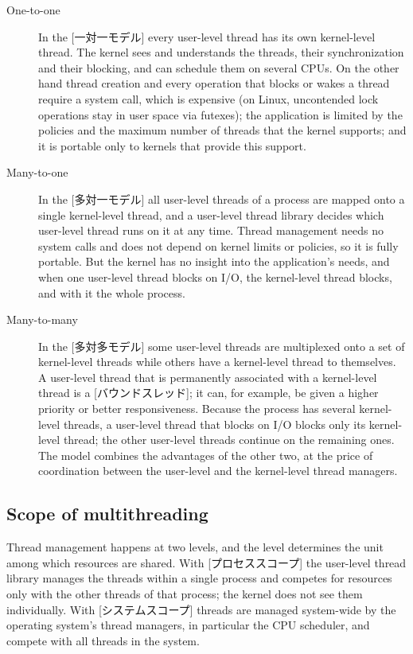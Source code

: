 \documentclass[../main.tex]{subfiles}
\begin{document}
\begin{description}
  \item[One-to-one] In the [一対一モデル] every
    user-level thread has its own kernel-level thread.  The kernel sees and
    understands the threads, their synchronization and their blocking, and
    can schedule them on several CPUs.  On the other hand thread creation
    and every operation that blocks or wakes a thread require a system
    call, which is expensive (on Linux, uncontended lock operations stay in
    user space via futexes); the application is limited by the policies and the maximum
    number of threads that the kernel supports; and it is portable only to
    kernels that provide this support.
  \item[Many-to-one] In the [多対一モデル] all
    user-level threads of a process are mapped onto a single kernel-level
    thread, and a user-level thread library decides which user-level thread
    runs on it at any time.  Thread management needs no system calls and
    does not depend on kernel limits or policies, so it is fully portable.
    But the kernel has no insight into the application's needs, and when
    one user-level thread blocks on I/O, the kernel-level thread blocks, and
    with it the whole process.
  \item[Many-to-many] In the [多対多モデル] some
    user-level threads are multiplexed onto a set of kernel-level threads
    while others have a kernel-level thread to themselves.  A user-level
    thread that is permanently associated with a kernel-level thread is a
    [バウンドスレッド]; it can, for example, be given a
    higher priority or better responsiveness.  Because the process has
    several kernel-level threads, a user-level thread that blocks on I/O
    blocks only its kernel-level thread; the other user-level threads
    continue on the remaining ones.  The model combines the
    advantages of the other two, at the price of coordination between the
    user-level and the kernel-level thread managers.
\end{description}


\subsection{Scope of multithreading}

Thread management happens at two levels, and the level determines the unit
among which resources are shared.
With [プロセススコープ] the user-level thread library
manages the threads within a single process and competes for resources only
with the other threads of that process; the kernel does not see them
individually.  With [システムスコープ] threads are
managed system-wide by the operating system's thread managers, in
particular the CPU scheduler, and compete with all threads in the
system.
\end{document}
